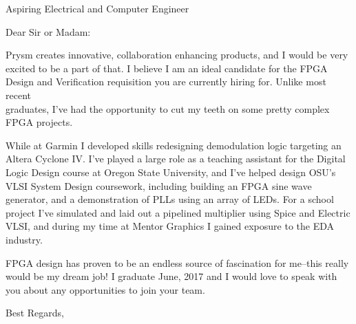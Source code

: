 \documentclass[]{friggeri-letter}
\begin{document}
       {Aspiring Electrical and Computer Engineer}

\begin{letter}{}

\opening{Dear Sir or Madam:}

Prysm creates innovative, collaboration enhancing products, and I 
would be very excited to be a part of that. I believe I am an ideal
candidate for the FPGA Design and Verification requisition you are
currently hiring for. Unlike most recent \\ graduates, I've had
the opportunity to cut my teeth on some pretty complex FPGA
projects.

While at Garmin I developed skills redesigning demodulation logic
targeting an Altera Cyclone IV. I've played a large role as 
a teaching assistant for the Digital Logic Design course at 
Oregon State University, and I've helped design OSU's VLSI System 
Design coursework, including building an FPGA sine wave generator, 
and a demonstration of PLLs using an array of LEDs. For a school 
project I've simulated and laid out a pipelined multiplier using 
Spice and Electric VLSI, and during my time at Mentor Graphics I 
gained exposure to the EDA industry.

FPGA design has proven to be an endless source of fascination for me--this 
really would be my dream job! I graduate June, 2017 and I would love to 
speak with you about any opportunities to join your team.

\closing{Best Regards,}

\end{letter}
\end{document}
